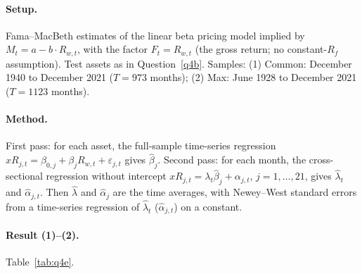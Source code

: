\documentclass[11pt]{article}
\begin{document}
\paragraph{Setup.}
Fama--MacBeth estimates of the linear beta pricing model implied by $M_t = a - b \cdot R_{w,t}$, with the
factor $F_t = R_{w,t}$ (the gross return; no constant-$R_f$ assumption). Test assets as in
Question~\ref{q4b}. Samples: (1) Common: December 1940 to December 2021 ($T = 973$ months); (2) Max: June 1928 to December 2021 ($T = 1123$ months).

\paragraph{Method.}
First pass: for each asset, the full-sample time-series regression
$xR_{j,t} = \beta_{0,j} + \beta_j R_{w,t} + \varepsilon_{j,t}$ gives $\hat{\beta}_j$. Second pass: for each
month, the cross-sectional regression without intercept $xR_{j,t} = \lambda_t \hat{\beta}_j + \alpha_{j,t}$,
$j = 1, \dots, 21$, gives $\hat{\lambda}_t$ and $\hat{\alpha}_{j,t}$. Then $\hat{\lambda}$ and
$\hat{\alpha}_j$ are the time averages, with Newey--West standard errors from a time-series regression of
$\hat{\lambda}_t$ ($\hat{\alpha}_{j,t}$) on a constant.

\paragraph{Result (1)--(2).}
Table~\ref{tab:q4e}.

\begin{table}[p]
  \centering
  \small
  \renewcommand{\arraystretch}{0.9}
  \captionsetup{font=small}
  
  \caption{Fama--MacBeth estimates of $\lambda$ and $\alpha_j$ with the factor $F_t = R_{w,t}$, for both sample
    versions (rows and blocks labelled by version). Samples: (1) Common: December 1940 to December 2021 ($T = 973$ months); (2) Max: June 1928 to December 2021 ($T = 1123$ months). Data: monthly observations of 12-month returns, as in
    Table~\ref{tab:q4b}. Units: decimals. Panel A: $\hat{\lambda}$ with its standard error in the next
    column; Panel B: $\hat{\alpha}_j$ with $t$-statistics, book-to-market and momentum deciles side by side and
    the market below; Panel C: Newey--West lags. Standard errors and $t$-statistics: Newey--West (1987, 1994)
    on a time-series regression of $\hat{\lambda}_t$ ($\hat{\alpha}_{j,t}$) on a constant, Bartlett kernel,
    Newey--West (1994) automatic lag rounded down, selected for each series (lags in Panel C).}
  \label{tab:q4e}
\end{table}
\end{document}
